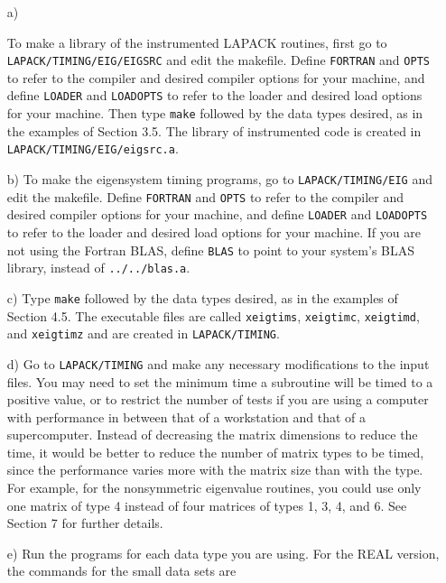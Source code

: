\begin{itemize}
\item[a)]
\begin{sloppypar}
To make a library of the instrumented LAPACK routines, first
go to {\tt LAPACK/TIMING/EIG/EIGSRC} and edit the makefile.
Define {\tt FORTRAN} and {\tt OPTS} to refer to the compiler
and desired compiler options for your machine,
and define {\tt LOADER} and {\tt LOADOPTS} to refer to
the loader and desired load options for your machine.
Then type {\tt make} followed by the data types desired, 
as in the examples of Section 3.5. 
The library of instrumented code is created in
{\tt LAPACK/TIMING/EIG/eigsrc.a}.
\end{sloppypar}

\item[b)]
To make the eigensystem timing programs, 
go to {\tt LAPACK/TIMING/EIG} and edit the makefile.
Define {\tt FORTRAN} and {\tt OPTS} to refer to the compiler
and desired compiler options for your machine,
and define {\tt LOADER} and {\tt LOADOPTS} to refer to
the loader and desired load options for your machine.
If you are not using the Fortran BLAS, define {\tt BLAS}
to point to your system's BLAS library, instead of {\tt ../../blas.a}.

\item[c)]
Type {\tt make} followed by the data types desired, as in the examples
of Section 4.5.  The executable files are called {\tt xeigtims},
{\tt xeigtimc}, {\tt xeigtimd}, and {\tt xeigtimz} and are created
in {\tt LAPACK/TIMING}.

\item[d)]
Go to {\tt LAPACK/TIMING} and
make any necessary modifications to the input files.
You may need to set the minimum time a subroutine will
be timed to a positive value, or to restrict the number of tests
if you are using a computer with performance in between that of a
workstation and that of a supercomputer.
Instead of decreasing the matrix dimensions to reduce the time,
it would be better to reduce the number of matrix types to be timed,
since the performance varies more with the matrix size than with the
type.  For example, for the nonsymmetric eigenvalue routines,
you could use only one matrix of type 4 instead of four matrices of
types 1, 3, 4, and 6.  See Section 7 for further details.

\item[e)]
Run the programs for each data type you are using. 
For the REAL version, the commands for the small data sets are


\end{itemize}
